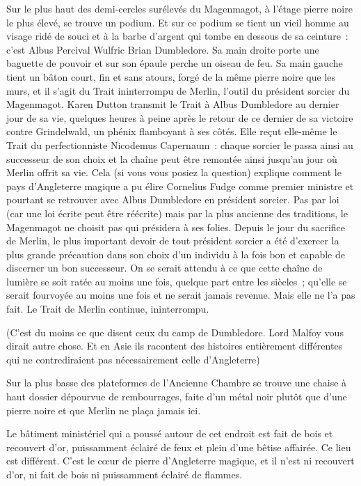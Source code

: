Sur le plus haut des demi-cercles surélevés du Magenmagot, à l'étage pierre noire le plus élevé, se trouve un podium.
Et sur ce podium se tient un vieil homme au visage ridé de souci et à la barbe d'argent qui tombe en dessous de sa ceinture~: c'est Albus Percival Wulfric Brian Dumbledore.
Sa main droite porte une baguette de pouvoir et sur son épaule perche un oiseau de feu.
Sa main gauche tient un bâton court, fin et sans atours, forgé de la même pierre noire que les murs, et il s'agit du Trait ininterrompu de Merlin, l'outil du président sorcier du Magenmagot.
Karen Dutton transmit le Trait à Albus Dumbledore au dernier jour de sa vie, quelques heures à peine après le retour de ce dernier de sa victoire contre Grindelwald, un phénix flamboyant à ses côtés.
Elle reçut elle-même le Trait du perfectionniste Nicodemus Capernaum~: chaque sorcier le passa ainsi au successeur de son choix et la chaîne peut être remontée ainsi jusqu'au jour où Merlin offrit sa vie.
Cela (si vous vous posiez la question) explique comment le pays d'Angleterre magique a pu élire Cornelius Fudge comme premier ministre et pourtant se retrouver avec Albus Dumbledore en président sorcier.
Pas par loi (car une loi écrite peut être réécrite) mais par la plus ancienne des traditions, le Magenmagot ne choisit pas qui présidera à ses folies.
Depuis le jour du sacrifice de Merlin, le plus important devoir de tout président sorcier a été d'exercer la plus grande précaution dans son choix d'un individu à la fois bon et capable de discerner un bon successeur.
On se serait attendu à ce que cette chaîne de lumière se soit ratée au moins une fois, quelque part entre les siècles~; qu'elle se serait fourvoyée au moins une fois et ne serait jamais revenue.
Mais elle ne l'a pas fait.
Le Trait de Merlin continue, ininterrompu.

(C'est du moins ce que disent ceux du camp de Dumbledore.
Lord Malfoy vous dirait autre chose.
Et en Asie ils racontent des histoires entièrement différentes qui ne contrediraient pas nécessairement celle d'Angleterre)

Sur la plus basse des plateformes de l'Ancienne Chambre se trouve une chaise à haut dossier dépourvue de rembourrages, faite d'un métal noir plutôt que d'une pierre noire et que Merlin ne plaça jamais ici.

Le bâtiment ministériel qui a poussé autour de cet endroit est fait de bois et recouvert d'or, puissamment éclairé de feux et plein d'une bêtise affairée.
Ce lieu est différent.
C'est le cœur de pierre d'Angleterre magique, et il n'est ni recouvert d'or, ni fait de bois ni puissamment éclairé de flammes.

